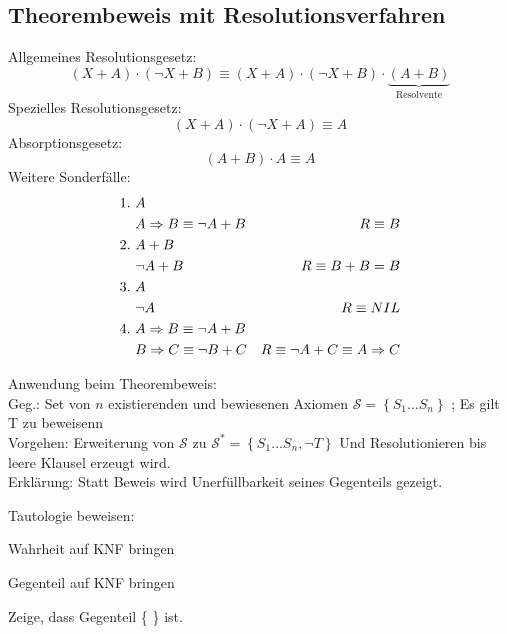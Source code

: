 \documentclass[german,color,6pt]{latex4ei/latex4ei_sheet}
\begin{document}
\begin{sectionbox}
\subsection{Theorembeweis mit Resolutionsverfahren}
Allgemeines Resolutionsgesetz:\\
\begin{equation*}
	(X + A) \cdot (\neg X + B) \equiv (X + A) \cdot (\neg X + B) \cdot \underbrace{(A + B)}_{\text{Resolvente}}
\end{equation*}
Spezielles Resolutionsgesetz:
\begin{equation*}
	(X + A) \cdot (\neg X + A) \equiv A
\end{equation*}
Absorptionsgesetz:
\begin{equation*}
	(A + B) \cdot A \equiv A
\end{equation*}
Weitere Sonderfälle:
\begin{equation*}
\begin{aligned}
1.\ & A \\
& A \Rightarrow B \equiv \neg A + B & R \equiv B \\
2.\ & A + B \\
& \neg A + B & R \equiv B + B = B \\
3.\ & A \\
& \neg A & R \equiv NIL \\
4.\ & A \Rightarrow B \equiv \neg A + B \\
& B \Rightarrow C \equiv \neg B + C & R \equiv \neg A + C \equiv A \Rightarrow C\\
\end{aligned}
\end{equation*}

%

Anwendung beim Theorembeweis: \\
Geg.: Set von $n$ existierenden und bewiesenen Axiomen $\mathcal S = \left\{S_1 \dots S_n \right\}$ ; Es gilt T zu beweisenn\\
Vorgehen: Erweiterung von $\mathcal S $ zu $\mathcal S^* = \left\{S_1 \dots S_n , \neg T \right\}$ Und Resolutionieren bis leere Klausel erzeugt wird. \\
Erklärung: Statt Beweis wird Unerfüllbarkeit seines Gegenteils gezeigt.

\begin{cookbox}{Tautologie beweisen: }
	\item Wahrheit auf KNF bringen
	\item Gegenteil auf KNF bringen
	\item Zeige, dass Gegenteil \{ \} ist.
\end{cookbox}
\end{sectionbox}
\end{document}
